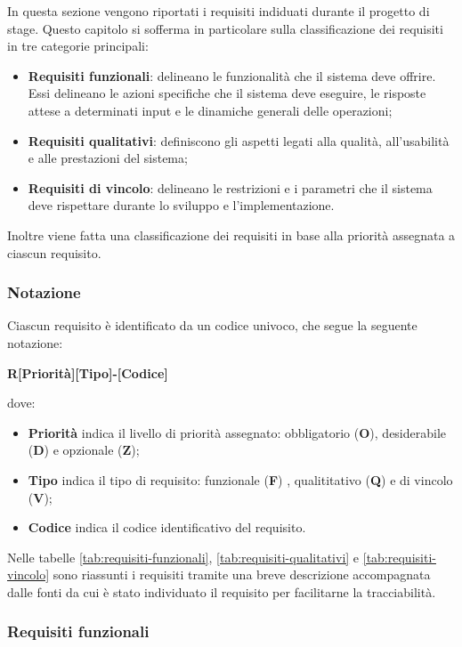 In questa sezione vengono riportati i requisiti indiduati durante il progetto di stage.
Questo capitolo si sofferma in particolare sulla classificazione dei requisiti in tre categorie principali:
\begin{itemize}
    \item \textbf{Requisiti funzionali}: delineano le funzionalità che il sistema deve offrire. Essi delineano le azioni specifiche che il sistema deve eseguire, le risposte attese a determinati input e le dinamiche generali delle operazioni;
    \item\textbf{Requisiti qualitativi}: definiscono gli aspetti legati alla qualità, all'usabilità e alle prestazioni del sistema;
    \item \textbf{Requisiti di vincolo}: delineano le restrizioni e i parametri che il sistema deve rispettare durante lo sviluppo e l'implementazione. 
\end{itemize}

Inoltre viene fatta una classificazione dei requisiti in base alla priorità assegnata a ciascun requisito.

\subsubsection{Notazione}
Ciascun requisito è identificato da un codice univoco, che segue la seguente notazione:
\begin{center}
    \textbf{R[Priorità][Tipo]-[Codice]}
\end{center}
  dove:
  \begin{itemize}
  \item \textbf{Priorità} indica il livello di priorità assegnato: obbligatorio (\textbf{O}), desiderabile (\textbf{D}) e opzionale (\textbf{Z});
  \item \textbf{Tipo} indica il tipo di requisito: funzionale (\textbf{F}) , qualititativo (\textbf{Q}) e di vincolo (\textbf{V});
  \item \textbf{Codice} indica il codice identificativo del requisito.
  \end{itemize}

Nelle tabelle \ref{tab:requisiti-funzionali}, \ref{tab:requisiti-qualitativi} e \ref{tab:requisiti-vincolo} sono riassunti i requisiti tramite una breve descrizione accompagnata dalle fonti da cui è stato individuato il requisito per
facilitarne la tracciabilità. 


\subsubsection{Requisiti funzionali}

